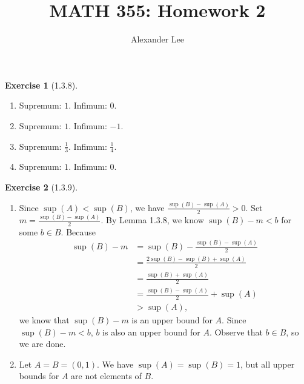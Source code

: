 \documentclass{amsart}
\title{MATH 355: Homework 2}
\author{Alexander Lee}
\theoremstyle{definition}
\newtheorem{exercise}{Exercise}
\begin{document}
\maketitle

\begin{exercise}[1.3.8]
  \begin{enumerate}[label={(\alph*)}]
    \item Supremum: $1$. Infimum: $0$.
    \item Supremum: $1$. Infimum: $-1$.
    \item Supremum: $\frac{1}{3}$. Infimum: $\frac{1}{4}$.
    \item Supremum: $1$. Infimum: $0$.
  \end{enumerate}
\end{exercise}

\begin{exercise}[1.3.9]
  \begin{enumerate}[label={(\alph*)}]
    \item Since $\sup(A) < \sup(B)$, we have $\frac{\sup(B) - \sup(A)}{2} > 0$.
      Set $m = \frac{\sup(B) - \sup(A)}{2}$. By Lemma 1.3.8, we know $\sup(B) -
      m < b$ for some $b \in B$. Because
      \begin{align*}
        \sup(B) - m &= \sup(B) - \frac{\sup(B) - \sup(A)}{2} \\
        &= \frac{2 \sup(B) - \sup(B) + \sup(A)}{2} \\
        &= \frac{\sup(B) + \sup(A)}{2} \\
        &= \frac{\sup(B) - \sup(A)}{2} + \sup(A) \\
        &> \sup(A),
      \end{align*}
      we know that $\sup(B) - m$ is an upper bound for $A$. Since $\sup(B) - m <
      b$, $b$ is also an upper bound for $A$. Observe that $b \in B$, so we are
      done.
    \item Let $A = B = (0, 1)$. We have $\sup(A) = \sup(B) = 1$, but all upper
      bounds for $A$ are not elements of $B$.
  \end{enumerate}
\end{exercise}
\end{document}
